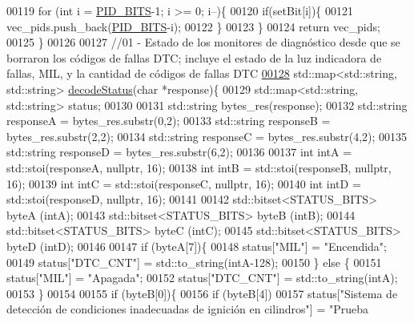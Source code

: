 \begin{DoxyCode}
00119     \textcolor{keywordflow}{for} (\textcolor{keywordtype}{int} i = \hyperlink{decoders_8hpp_a8a092c91721f7da8bb812b510993ad3e}{PID\_BITS}-1; i >= 0; i--)\{
00120         \textcolor{keywordflow}{if}(setBit[i])\{
00121             vec\_pids.push\_back(\hyperlink{decoders_8hpp_a8a092c91721f7da8bb812b510993ad3e}{PID\_BITS}-i);
00122         \}
00123     \}
00124     \textcolor{keywordflow}{return} vec\_pids;
00125 \}
00126 
00127 \textcolor{comment}{//01 - Estado de los monitores de diagnóstico desde que se borraron los códigos de fallas DTC; incluye el
       estado de la luz indicadora de fallas, MIL, y la cantidad de códigos de fallas DTC }
\hyperlink{decoders_8hpp_aca9cad863d8603615597a0291804c8ae}{00128} std::map<std::string, std::string> \hyperlink{decoders_8cpp_aca9cad863d8603615597a0291804c8ae}{decodeStatus}(\textcolor{keywordtype}{char} *response)\{
00129     std::map<std::string, std::string> status;
00130 
00131     std::string bytes\_res(response);
00132     std::string responseA = bytes\_res.substr(0,2);
00133     std::string responseB = bytes\_res.substr(2,2);
00134     std::string responseC = bytes\_res.substr(4,2);
00135     std::string responseD = bytes\_res.substr(6,2);
00136     
00137     \textcolor{keywordtype}{int} intA = std::stoi(responseA, \textcolor{keyword}{nullptr}, 16);
00138     \textcolor{keywordtype}{int} intB = std::stoi(responseB, \textcolor{keyword}{nullptr}, 16);
00139     \textcolor{keywordtype}{int} intC = std::stoi(responseC, \textcolor{keyword}{nullptr}, 16);
00140     \textcolor{keywordtype}{int} intD = std::stoi(responseD, \textcolor{keyword}{nullptr}, 16);
00141     
00142     std::bitset<STATUS\_BITS> byteA (intA);
00143     std::bitset<STATUS\_BITS> byteB (intB);
00144     std::bitset<STATUS\_BITS> byteC (intC);
00145     std::bitset<STATUS\_BITS> byteD (intD);
00146 
00147     \textcolor{keywordflow}{if} (byteA[7])\{
00148         status[\textcolor{stringliteral}{"MIL"}] = \textcolor{stringliteral}{"Encendida"};
00149         status[\textcolor{stringliteral}{"DTC\_CNT"}] = std::to\_string(intA-128);
00150     \} \textcolor{keywordflow}{else} \{
00151         status[\textcolor{stringliteral}{"MIL"}] = \textcolor{stringliteral}{"Apagada"};
00152         status[\textcolor{stringliteral}{"DTC\_CNT"}] = std::to\_string(intA);
00153     \}
00154 
00155     \textcolor{keywordflow}{if} (byteB[0])\{
00156         \textcolor{keywordflow}{if} (byteB[4])
00157             status[\textcolor{stringliteral}{"Sistema de detección de condiciones inadecuadas de ignición en cilindros"}] = \textcolor{stringliteral}{"Prueba
}
\end{DoxyCode}
